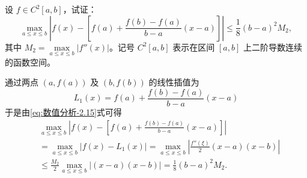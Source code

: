\documentclass[../../main.tex]{subfiles}
\begin{document}
\begin{example}
设 $f \in C^2[a, b]$，试证： 
\[
\max_{a \leqslant x \leqslant b} \left| f(x) - \left[ f(a) + \frac{f(b) - f(a)}{b - a}(x - a) \right] \right| \leqslant \frac{1}{8}(b - a)^2 M_2,
\]
其中 $M_2 = \max\limits_{a \leqslant x \leqslant b} |f''(x)|$。记号 $C^2[a, b]$ 表示在区间 $[a, b]$ 上二阶导数连续的函数空间。
\end{example}
\begin{solution}
通过两点 $(a, f(a))$ 及 $(b, f(b))$ 的线性插值为 
\[
L_1(x) = f(a) + \frac{f(b) - f(a)}{b - a}(x - a)
\]
于是由\eqref{eq:数值分析-2.15}式可得
\begin{align*}
&\max_{a \leqslant x \leqslant b} \left| f(x) - \left[ f(a) + \frac{f(b) - f(a)}{b - a}(x - a) \right] \right| \\
&= \max_{a \leqslant x \leqslant b} |f(x) - L_1(x)| = \max_{a \leqslant x \leqslant b} \left| \frac{f''(\xi)}{2}(x - a)(x - b) \right| \\
&\leqslant \frac{M_2}{2} \max_{a \leqslant x \leqslant b} |(x - a)(x - b)| = \frac{1}{8}(b - a)^2 M_2.
\end{align*}
\end{solution}
\end{document}
